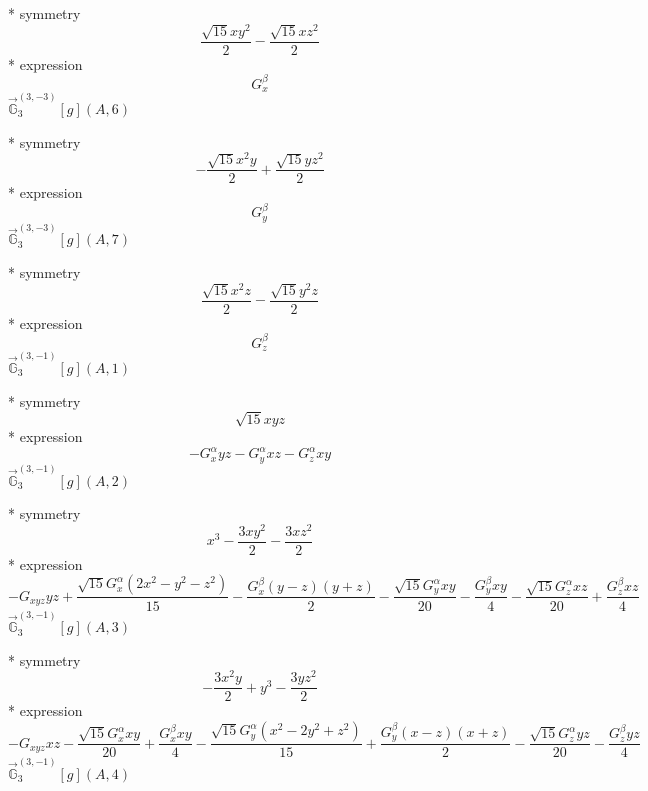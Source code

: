 \documentclass[fleqn,8pt]{jsarticle}
\begin{document}
\noindent\quad ** symmetry
\begin{dmath*}
\frac{\sqrt{15} x y^{2}}{2} - \frac{\sqrt{15} x z^{2}}{2}
\end{dmath*}
\noindent\quad ** expression
\begin{dmath*}
G_{x}^{\beta}
\end{dmath*}
\noindent\quad $\vec{\mathbb{G}}_{3}^{(3,-3)}[g](A,6)$

\noindent\quad ** symmetry
\begin{dmath*}
- \frac{\sqrt{15} x^{2} y}{2} + \frac{\sqrt{15} y z^{2}}{2}
\end{dmath*}
\noindent\quad ** expression
\begin{dmath*}
G_{y}^{\beta}
\end{dmath*}
\noindent\quad $\vec{\mathbb{G}}_{3}^{(3,-3)}[g](A,7)$

\noindent\quad ** symmetry
\begin{dmath*}
\frac{\sqrt{15} x^{2} z}{2} - \frac{\sqrt{15} y^{2} z}{2}
\end{dmath*}
\noindent\quad ** expression
\begin{dmath*}
G_{z}^{\beta}
\end{dmath*}
\noindent\quad $\vec{\mathbb{G}}_{3}^{(3,-1)}[g](A,1)$

\noindent\quad ** symmetry
\begin{dmath*}
\sqrt{15} x y z
\end{dmath*}
\noindent\quad ** expression
\begin{dmath*}
- G_{x}^{\alpha} y z - G_{y}^{\alpha} x z - G_{z}^{\alpha} x y
\end{dmath*}
\noindent\quad $\vec{\mathbb{G}}_{3}^{(3,-1)}[g](A,2)$

\noindent\quad ** symmetry
\begin{dmath*}
x^{3} - \frac{3 x y^{2}}{2} - \frac{3 x z^{2}}{2}
\end{dmath*}
\noindent\quad ** expression
\begin{dmath*}
- G_{xyz} y z + \frac{\sqrt{15} G_{x}^{\alpha} \left(2 x^{2} - y^{2} - z^{2}\right)}{15} - \frac{G_{x}^{\beta} \left(y - z\right) \left(y + z\right)}{2} - \frac{\sqrt{15} G_{y}^{\alpha} x y}{20} - \frac{G_{y}^{\beta} x y}{4} - \frac{\sqrt{15} G_{z}^{\alpha} x z}{20} + \frac{G_{z}^{\beta} x z}{4}
\end{dmath*}
\noindent\quad $\vec{\mathbb{G}}_{3}^{(3,-1)}[g](A,3)$

\noindent\quad ** symmetry
\begin{dmath*}
- \frac{3 x^{2} y}{2} + y^{3} - \frac{3 y z^{2}}{2}
\end{dmath*}
\noindent\quad ** expression
\begin{dmath*}
- G_{xyz} x z - \frac{\sqrt{15} G_{x}^{\alpha} x y}{20} + \frac{G_{x}^{\beta} x y}{4} - \frac{\sqrt{15} G_{y}^{\alpha} \left(x^{2} - 2 y^{2} + z^{2}\right)}{15} + \frac{G_{y}^{\beta} \left(x - z\right) \left(x + z\right)}{2} - \frac{\sqrt{15} G_{z}^{\alpha} y z}{20} - \frac{G_{z}^{\beta} y z}{4}
\end{dmath*}
\noindent\quad $\vec{\mathbb{G}}_{3}^{(3,-1)}[g](A,4)$
\end{document}
